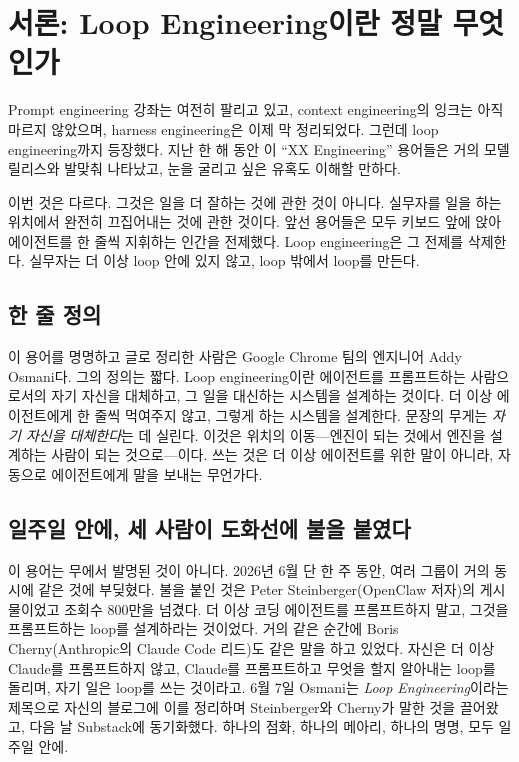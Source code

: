 \documentclass[conference]{IEEEtran}
\begin{document}
\section{서론: Loop Engineering이란 정말 무엇인가}
Prompt engineering 강좌는 여전히 팔리고 있고, context engineering의 잉크는 아직 마르지 않았으며, harness engineering은 이제 막 정리되었다. 그런데 loop engineering까지 등장했다. 지난 한 해 동안 이 ``XX Engineering'' 용어들은 거의 모델 릴리스와 발맞춰 나타났고, 눈을 굴리고 싶은 유혹도 이해할 만하다.

이번 것은 다르다. 그것은 일을 더 잘하는 것에 관한 것이 아니다. 실무자를 일을 하는 위치에서 완전히 끄집어내는 것에 관한 것이다. 앞선 용어들은 모두 키보드 앞에 앉아 에이전트를 한 줄씩 지휘하는 인간을 전제했다. Loop engineering은 그 전제를 삭제한다. 실무자는 더 이상 loop 안에 있지 않고, loop 밖에서 loop를 만든다.

\subsection{한 줄 정의}
이 용어를 명명하고 글로 정리한 사람은 Google Chrome 팀의 엔지니어 Addy Osmani다. 그의 정의는 짧다. Loop engineering이란 에이전트를 프롬프트하는 사람으로서의 자기 자신을 대체하고, 그 일을 대신하는 시스템을 설계하는 것이다. 더 이상 에이전트에게 한 줄씩 먹여주지 않고, 그렇게 하는 시스템을 설계한다. 문장의 무게는 \emph{자기 자신을 대체한다}는 데 실린다. 이것은 위치의 이동---엔진이 되는 것에서 엔진을 설계하는 사람이 되는 것으로---이다. 쓰는 것은 더 이상 에이전트를 위한 말이 아니라, 자동으로 에이전트에게 말을 보내는 무언가다.

\subsection{일주일 안에, 세 사람이 도화선에 불을 붙였다}
이 용어는 무에서 발명된 것이 아니다. 2026년 6월 단 한 주 동안, 여러 그룹이 거의 동시에 같은 것에 부딪혔다. 불을 붙인 것은 Peter Steinberger(OpenClaw 저자)의 게시물이었고 조회수 800만을 넘겼다. 더 이상 코딩 에이전트를 프롬프트하지 말고, 그것을 프롬프트하는 loop를 설계하라는 것이었다. 거의 같은 순간에 Boris Cherny(Anthropic의 Claude Code 리드)도 같은 말을 하고 있었다. 자신은 더 이상 Claude를 프롬프트하지 않고, Claude를 프롬프트하고 무엇을 할지 알아내는 loop를 돌리며, 자기 일은 loop를 쓰는 것이라고. 6월 7일 Osmani는 \emph{Loop Engineering}이라는 제목으로 자신의 블로그에 이를 정리하며 Steinberger와 Cherny가 말한 것을 끌어왔고, 다음 날 Substack에 동기화했다. 하나의 점화, 하나의 메아리, 하나의 명명, 모두 일주일 안에.
\end{document}
